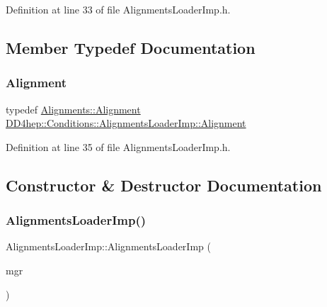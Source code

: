 Definition at line 33 of file Alignments\+Loader\+Imp.\+h.



\subsection{Member Typedef Documentation}
\hypertarget{class_d_d4hep_1_1_conditions_1_1_alignments_loader_imp_a2af19e971736ac6856523194f7eb717a}{}\label{class_d_d4hep_1_1_conditions_1_1_alignments_loader_imp_a2af19e971736ac6856523194f7eb717a} 
\subsubsection{\texorpdfstring{Alignment}{Alignment}}
{\footnotesize\ttfamily typedef \hyperlink{class_d_d4hep_1_1_alignments_1_1_alignment}{Alignments\+::\+Alignment} \hyperlink{class_d_d4hep_1_1_conditions_1_1_alignments_loader_imp_a2af19e971736ac6856523194f7eb717a}{D\+D4hep\+::\+Conditions\+::\+Alignments\+Loader\+Imp\+::\+Alignment}}



Definition at line 35 of file Alignments\+Loader\+Imp.\+h.



\subsection{Constructor \& Destructor Documentation}
\hypertarget{class_d_d4hep_1_1_conditions_1_1_alignments_loader_imp_a82c0f304132e15093e9e2a7a74e33f00}{}\label{class_d_d4hep_1_1_conditions_1_1_alignments_loader_imp_a82c0f304132e15093e9e2a7a74e33f00} 
\subsubsection{\texorpdfstring{Alignments\+Loader\+Imp()}{AlignmentsLoaderImp()}}
{\footnotesize\ttfamily Alignments\+Loader\+Imp\+::\+Alignments\+Loader\+Imp (\begin{DoxyParamCaption}\item[{\hyperlink{class_d_d4hep_1_1_conditions_1_1_conditions_manager}{Conditions\+Manager}}]{mgr }\end{DoxyParamCaption})}



